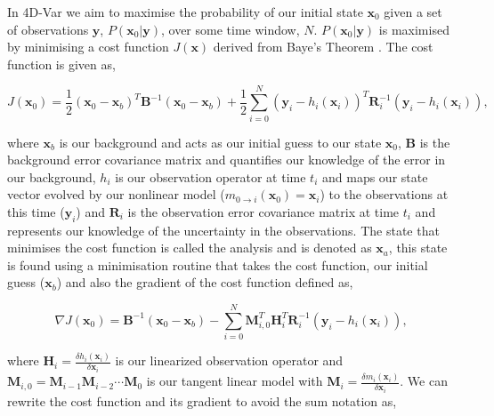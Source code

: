 \documentclass[11pt]{article}
\begin{document}
In 4D-Var we aim to maximise the probability of our initial state $\textbf{x}_0$ given a set of observations $\textbf{y}$, $P(\textbf{x}_0|\textbf{y})$, over some time window, $N$. $P(\textbf{x}_0|\textbf{y})$ is maximised by minimising a cost function $J(\textbf{x})$ derived from Baye's Theorem \citep{lewis2006dynamic}. The cost function is given as,

\begin{equation}
J(\textbf{x}_0) = \frac{1}{2}(\textbf{x}_0-\textbf{x}_b)^{T}\textbf{B}^{-1}(\textbf{x}_0-\textbf{x}_b)+\frac{1}{2}\sum_{i=0}^{N}(\textbf{y}_i-h_i(\textbf{x}_i))^{T}\textbf{R}_{i}^{-1}(\textbf{y}_i-h_i(\textbf{x}_i)),
\end{equation}

where $\textbf{x}_b$ is our background and acts as our initial guess to our state $\textbf{x}_0$, $\textbf{B}$ is the background error covariance matrix and quantifies our knowledge of the error in our background, $h_i$ is our observation operator at time $t_i$ and maps our state vector evolved by our nonlinear model ($m_{0\rightarrow i}(\mathbf{x}_{0})=\textbf{x}_i$) to the observations at this time ($\textbf{y}_i$) and $\textbf{R}_i$ is the observation error covariance matrix at time $t_i$ and represents our knowledge of the uncertainty in the observations. The state that minimises the cost function is called the analysis and is denoted as $\textbf{x}_a$, this state is found using a minimisation routine that takes the cost function, our initial guess ($\textbf{x}_b$) and also the gradient of the cost function defined as,

\begin{equation}
\nabla J(\textbf{x}_0) = \textbf{B}^{-1}(\textbf{x}_0-\textbf{x}_b)-\sum_{i=0}^{N}\textbf{M}_{i,0}^{T}\textbf{H}_i^{T}\textbf{R}_{i}^{-1}(\textbf{y}_i-h_i(\textbf{x}_i)),
\end{equation}

where $\textbf{H}_i = \frac{\delta h_i(\textbf{x}_i)}{\delta\textbf{x}_i}$ is our linearized observation operator and $\mathbf{M}_{i,0}=\mathbf{M}_{i-1}\mathbf{M}_{i-2}\cdots\mathbf{M}_0$ is our tangent linear model with $\mathbf{M}_i=\frac{\delta m_{i}(\textbf{x}_{i})}{\delta \textbf{x}_{i}}$. We can rewrite the cost function and its gradient to avoid the sum notation as,
\end{document}

